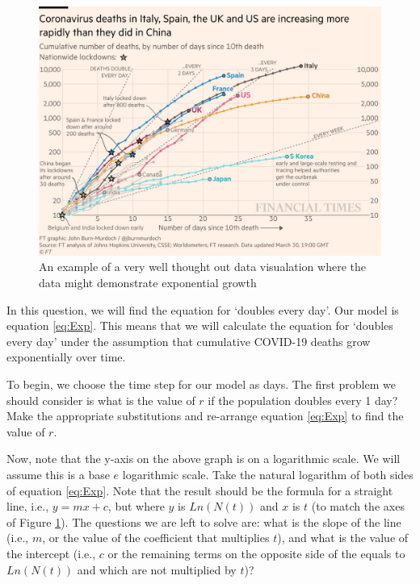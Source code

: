 \documentclass[]{book}
\begin{document}
\begin{enumerate}
  \begin{figure}
  \includegraphics[width=0.95\linewidth]{figures/doublingtime} \caption{An example of a very well thought out data visualation where the data might demonstrate exponential growth}\label{fig:doublingtime}
  \end{figure}
\end{enumerate}

In this question, we will find the equation for `doubles every day'. Our
model is equation \eqref{eq:Exp}. This means that we will calculate the
equation for `doubles every day' under the assumption that cumulative
COVID-19 deaths grow exponentially over time.

To begin, we choose the time step for our model as days. The first
problem we should consider is what is the value of \(r\) if the
population doubles every 1 day? Make the appropriate substitutions and
re-arrange equation \eqref{eq:Exp} to find the value of \(r\).

Now, note that the y-axis on the above graph is on a logarithmic scale.
We will assume this is a base \(e\) logarithmic scale. Take the natural
logarithm of both sides of equation \eqref{eq:Exp}. Note that the result
should be the formula for a straight line, i.e., \(y = mx + c\), but
where \(y\) is \(Ln(N(t))\) and \(x\) is \(t\) (to match the axes of
Figure \ref{fig:doublingtime}). The questions we are left to solve are:
what is the slope of the line (i.e., \(m\), or the value of the
coefficient that multiplies \(t\)), and what is the value of the
intercept (i.e., \(c\) or the remaining terms on the opposite side of
the equals to \(Ln(N(t))\) and which are not multiplied by \(t\))?
\end{document}
